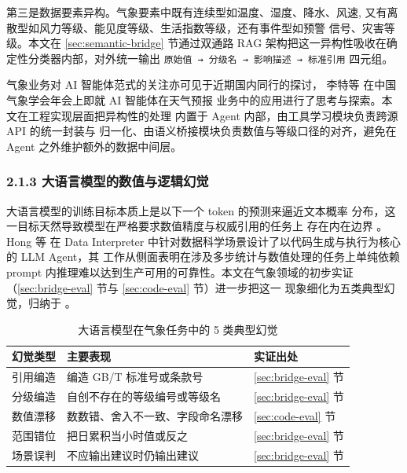 第三是数据要素异构。气象要素中既有连续型如温度、湿度、降水、风速,
又有离散型如风力等级、能见度等级、生活指数等级，还有事件型如预警
信号、灾害等级。本文在 \ref{sec:semantic-bridge} 节通过双通路 RAG
架构把这一异构性吸收在确定性分类器内部，对外统一输出 \texttt{原始值
→ 分级名 → 影响描述 → 标准引用} 四元组。

气象业务对 AI 智能体范式的关注亦可见于近期国内同行的探讨，
李特等 \cite{ref2} 在中国气象学会年会上即就 AI 智能体在天气预报
业务中的应用进行了思考与探索。本文在工程实现层面把异构性的处理
内置于 Agent 内部，由工具学习模块负责跨源 API 的统一封装与
归一化、由语义桥接模块负责数值与等级口径的对齐，避免在 Agent
之外维护额外的数据中间层。

\subsubsection*{2.1.3 \quad 大语言模型的数值与逻辑幻觉}

大语言模型的训练目标本质上是以下一个 token 的预测来逼近文本概率
分布，这一目标天然导致模型在严格要求数值精度与权威引用的任务上
存在内在边界 \cite{ref10}。Hong 等 \cite{ref20} 在 Data Interpreter
中针对数据科学场景设计了以代码生成与执行为核心的 LLM Agent，其
工作从侧面表明在涉及多步统计与数值处理的任务上单纯依赖 prompt
内推理难以达到生产可用的可靠性。本文在气象领域的初步实证
（\ref{sec:bridge-eval} 节与 \ref{sec:code-eval} 节）进一步把这一
现象细化为五类典型幻觉，归纳于 。

\begin{table}[!ht]
    \centering
    \caption{大语言模型在气象任务中的 5 类典型幻觉}
    \label{tab:hallucination-types}
    \song\fontsize{9pt}{12pt}\selectfont
    \renewcommand{\arraystretch}{0.95}
    \begin{tabular}{lll}
        \toprule
        幻觉类型 & 主要表现 & 实证出处 \\
        \midrule
        引用编造 & 编造 GB/T 标准号或条款号 & \ref{sec:bridge-eval} 节 \\
        分级编造 & 自创不存在的等级编号或等级名 & \ref{sec:bridge-eval} 节 \\
        数值漂移 & 数数错、舍入不一致、字段命名漂移 & \ref{sec:code-eval} 节 \\
        范围错位 & 把日累积当小时值或反之 & \ref{sec:bridge-eval} 节 \\
        场景误判 & 不应输出建议时仍输出建议 & \ref{sec:bridge-eval} 节 \\
        \bottomrule
    \end{tabular}
\end{table}

